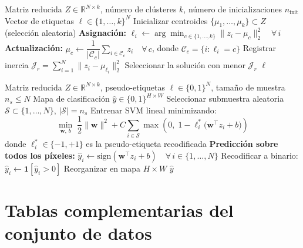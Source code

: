 \begin{algorithm}[H]
	\caption{K-Means por lotes: agrupamiento no supervisado}
	\label{alg:kmeans}
	\begin{algorithmic}[1]
	\Require Matriz reducida $Z \in \mathbb{R}^{N \times k}$, número de clústeres $k$,
			 número de inicializaciones $n_{\text{init}}$
	\Ensure  Vector de etiquetas $\ell \in \{1,\ldots,k\}^N$
		\State Inicializar centroides $\{\mu_1,\ldots,\mu_k\} \subset Z$ (selección aleatoria)
		\Repeat
			\State \textbf{Asignación:} $\ell_i \leftarrow \arg\min_{c \in \{1,\ldots,k\}}
				   \|z_i - \mu_c\|_2^2 \quad \forall\, i$
			\State \textbf{Actualización:}
				   $\mu_c \leftarrow \dfrac{1}{|\mathcal{C}_c|}\sum_{i \in \mathcal{C}_c} z_i
				   \quad \forall\, c$,
				   donde $\mathcal{C}_c = \{i : \ell_i = c\}$
		\State Registrar inercia $\mathcal{J}_r = \sum_{i=1}^N \|z_i - \mu_{\ell_i}\|_2^2$
	\EndFor
	\State Seleccionar la solución con menor $\mathcal{J}_r$
	\State \Return $\ell$
	\end{algorithmic}
\end{algorithm}
\begin{algorithm}[H]
\caption{SVM lineal: clasificación sobre pseudo-etiquetas K-Means}
\label{alg:svm}
\begin{algorithmic}[1]
\Require Matriz reducida $Z \in \mathbb{R}^{N \times k}$,
         pseudo-etiquetas $\ell \in \{0,1\}^N$,
         tamaño de muestra $n_s \le N$
\Ensure  Mapa de clasificación $\hat{y} \in \{0,1\}^{H \times W}$
\State Seleccionar submuestra aleatoria $\mathcal{S} \subset \{1,\ldots,N\}$,
       $|\mathcal{S}| = n_s$
\State Entrenar SVM lineal minimizando:
\[
\min_{\mathbf{w},\,b}\; \frac{1}{2}\|\mathbf{w}\|^2 + C\sum_{i \in \mathcal{S}}
\max\!\left(0,\;1 - \ell_i^*\bigl(\mathbf{w}^\top z_i + b\bigr)\right)
\]
donde $\ell_i^* \in \{-1,+1\}$ es la pseudo-etiqueta recodificada
\State \textbf{Predicción sobre todos los píxeles:}
       $\hat{y}_i \leftarrow \text{sign}\!\left(\mathbf{w}^\top z_i + b\right)
       \quad \forall\, i \in \{1,\ldots,N\}$
\State Recodificar a binario: $\hat{y}_i \leftarrow \mathbf{1}[\hat{y}_i > 0]$
\State Reorganizar en mapa $H \times W$
\State \Return $\hat{y}$
\end{algorithmic}
\end{algorithm}

\section{Tablas complementarias del conjunto de datos}

